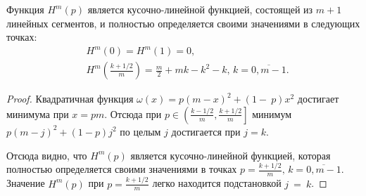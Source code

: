 \begin{lemma}
\label{lemma:upper_bound:function}
Функция $ H^m(p) $ является кусочно-линейной функцией, состоящей из $ m + 1 $ линейных сегментов, и полностью определяется своими значениями в следующих точках:
\begin{eqnarray*}
& H^m(0) = H^m(1) = 0, \\
& H^m\left(\frac{k+1/2}{m}\right) 
    = \frac{m}{2} + mk - k^2 - k, 
        \, k = \overline{0, m - 1}.
\end{eqnarray*}
\end{lemma}
\begin{proof}
Квадратичная функция $ \omega(x) = p(m-x)^2 + (1-~p)x^2 $ достигает минимума при $ x = pm $. 
Отсюда при $ p \in \left( \frac{k - 1/2}{m}, \frac{k+1/2}{m} \right] $ минимум $ p(m-j)^2 + (1-p)j^2 $ по целым $ j $ достигается при $ j = k $.
 
Отсюда видно, что $ H^m(p) $ является кусочно-линейной функцией, которая полностью определяется своими значениями в точках $ p = \frac{k+1/2}{m}, \, k = \overline{0, m-1} $. 
Значение $ H^m(p) $ при $ p = \frac{k+1/2}{m} $ легко находится подстановкой $ j~=~k $.
\end{proof}